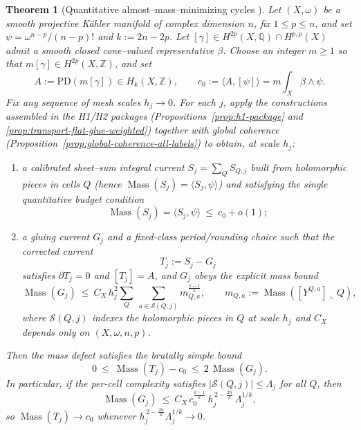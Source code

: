 \documentclass[11pt]{article}
\numberwithin{equation}{section}  %
\theoremstyle{plain}
\newtheorem{theorem}{Theorem}[section]
\theoremstyle{definition}
\theoremstyle{remark}
\newcommand{\Z}{\mathbb{Z}}
\newcommand{\Q}{\mathbb{Q}}
\DeclareMathOperator{\Mass}{Mass}
\begin{document}
\begin{theorem}[Quantitative almost--mass--minimizing cycles ]
\label{thm:spine-quantitative}
Let $(X,\omega)$ be a smooth projective K\"ahler manifold of complex dimension $n$, fix $1\le p\le n$, and set $\psi=\omega^{n-p}/(n-p)!$ and $k:=2n-2p$.
Let $[\gamma]\in H^{2p}(X,\Q)\cap H^{p,p}(X)$ admit a smooth closed cone--valued representative $\beta$.
Choose an integer $m\ge 1$ so that $m[\gamma]\in H^{2p}(X,\Z)$, and set
\[
A:=\mathrm{PD}(m[\gamma])\in H_k(X,\Z),
\qquad
c_0:=\langle A,[\psi]\rangle
=m\int_X \beta\wedge\psi.
\]
Fix any sequence of mesh scales $h_j\to 0$. For each $j$, apply the constructions assembled in the H1/H2 packages (Propositions~\ref{prop:h1-package} and \ref{prop:transport-flat-glue-weighted}) together with global coherence (Proposition~\ref{prop:global-coherence-all-labels}) to obtain, at scale $h_j$:
\begin{enumerate}
\item[\textnormal{(H1)}] a \emph{calibrated sheet--sum} integral current $S_j=\sum_Q S_{Q,j}$ built from holomorphic pieces in cells $Q$ (hence $\Mass(S_j)=\langle S_j,\psi\rangle$) and satisfying the single quantitative budget condition
\[
\Mass(S_j)=\langle S_j,\psi\rangle\ \le\ c_0+o(1);
\]
\item[\textnormal{(H2)}] a \emph{gluing current} $G_j$ and a fixed-class \emph{period/rounding choice} such that the corrected current
\[
T_j:=S_j-G_j
\]
satisfies $\partial T_j=0$ and $[T_j]=A$, and $G_j$ obeys the explicit mass bound
\[
\Mass(G_j)\ \le\ C_X\,h_j^2\sum_Q\ \sum_{a\in\mathcal S(Q,j)} m_{Q,a}^{\frac{k-1}{k}},
\qquad m_{Q,a}:=\Mass([Y^{Q,a}]\llcorner Q),
\]
where $\mathcal S(Q,j)$ indexes the holomorphic pieces in $Q$ at scale $h_j$ and $C_X$ depends only on $(X,\omega,n,p)$.
\end{enumerate}
Then the \emph{mass defect} satisfies the brutally simple bound
\[
0\ \le\ \Mass(T_j)-c_0\ \le\ 2\,\Mass(G_j).
\]
In particular, if the per-cell complexity satisfies $|\mathcal S(Q,j)|\le \Lambda_j$ for all $Q$, then
\[
\Mass(G_j)\ \le\ C_X\,c_0^{\frac{k-1}{k}}\,h_j^{\,2-\frac{2n}{k}}\,\Lambda_j^{1/k},
\]
so $\Mass(T_j)\to c_0$ whenever $h_j^{\,2-\frac{2n}{k}}\Lambda_j^{1/k}\to 0$.
\end{theorem}
\end{document}
